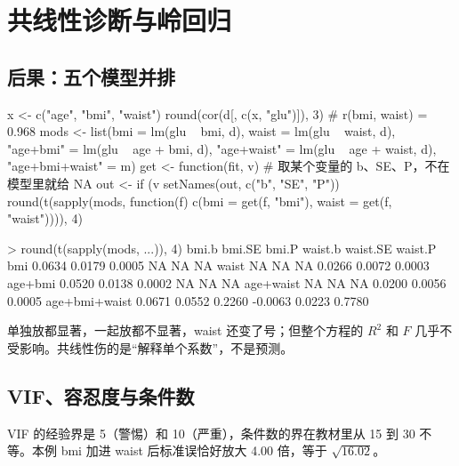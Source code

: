 \section{共线性诊断与岭回归}

\subsection{后果：五个模型并排}
\begin{RCode}
x <- c("age", "bmi", "waist")
round(cor(d[, c(x, "glu")]), 3)                  # r(bmi, waist) = 0.968
mods <- list(bmi = lm(glu ~ bmi, d), waist = lm(glu ~ waist, d),
             "age+bmi" = lm(glu ~ age + bmi, d), "age+waist" = lm(glu ~ age + waist, d),
             "age+bmi+waist" = m)
get <- function(fit, v) {                        # 取某个变量的 b、SE、P，不在模型里就给 NA
  out <- if (v %
  setNames(out, c("b", "SE", "P"))
}
round(t(sapply(mods, function(f) c(bmi = get(f, "bmi"), waist = get(f, "waist")))), 4)
\end{RCode}
\begin{ROut}
> round(t(sapply(mods, ...)), 4)
               bmi.b bmi.SE  bmi.P waist.b waist.SE waist.P
bmi           0.0634 0.0179 0.0005      NA       NA      NA
waist             NA     NA     NA  0.0266   0.0072  0.0003
age+bmi       0.0520 0.0138 0.0002      NA       NA      NA
age+waist         NA     NA     NA  0.0200   0.0056  0.0005
age+bmi+waist 0.0671 0.0552 0.2260 -0.0063   0.0223  0.7780
\end{ROut}
单独放都显著，一起放都不显著，waist 还变了号；但整个方程的 $R^2$ 和 $F$ 几乎不受影响。共线性伤的是“解释单个系数”，不是预测。

\subsection{VIF、容忍度与条件数}
VIF 的经验界是 5（警惕）和 10（严重），条件数的界在教材里从 15 到 30 不等。本例 bmi 加进 waist 后标准误恰好放大 4.00 倍，等于 $$。

